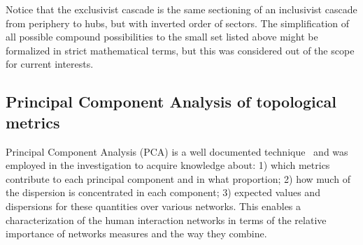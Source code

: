 \documentclass[%
	aip,
	jmp,%
	amsmath,amssymb,
	reprint,%
]{revtex4-1}
\begin{document}
																																																																																Notice that the exclusivist cascade is the same sectioning of an inclusivist cascade from periphery to hubs, but with inverted order of sectors. 
																																																																																The simplification of all possible compound possibilities to the small set listed above might be formalized in strict mathematical terms, but this was considered out of the scope for current interests.




																																																																																\subsection{Principal Component Analysis of topological metrics}\label{sec:pca}
																																																																																Principal Component Analysis (PCA) is a well documented technique~\cite{pca}
																																																																																and was employed in the investigation to acquire knowledge about:
																																																																																1) which metrics contribute to each principal component and in what proportion;
																																																																																2) how much of the dispersion is concentrated in each component;
																																																																																3) expected values and dispersions for these quantities over various networks.
																																																																																This enables a characterization of the human interaction networks
																																																																																in terms of the relative importance of networks measures and the way they combine.
\end{document}
